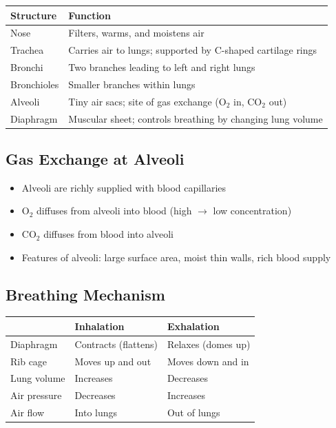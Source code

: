 \documentclass[12pt]{article}
\newcommand{\hcell}[1]{\textbf{\color{white}#1}}
\begin{document}
\begin{center}
\renewcommand{\arraystretch}{1.4}
\begin{tabular}{|C{4cm}|C{8.5cm}|}
\hline
{}\hcell{Structure} & \hcell{Function} \\
\hline
Nose & Filters, warms, and moistens air \\
 Trachea & Carries air to lungs; supported by C-shaped cartilage rings \\
Bronchi & Two branches leading to left and right lungs \\
 Bronchioles & Smaller branches within lungs \\
Alveoli & Tiny air sacs; site of gas exchange (O$_2$ in, CO$_2$ out) \\
 Diaphragm & Muscular sheet; controls breathing by changing lung volume \\
\hline
\end{tabular}
\end{center}

\subsection{Gas Exchange at Alveoli}
\begin{itemize}[leftmargin=16pt, itemsep=3pt]
  \item Alveoli are richly supplied with blood capillaries
  \item O$_2$ diffuses from alveoli into blood (high $\to$ low concentration)
  \item CO$_2$ diffuses from blood into alveoli
  \item Features of alveoli: large surface area, moist thin walls, rich blood supply
\end{itemize}

\subsection{Breathing Mechanism}
\begin{center}
\renewcommand{\arraystretch}{1.3}
\begin{tabular}{|C{3.5cm}|C{4.5cm}|C{4.5cm}|}
\hline
{}\hcell{} & \hcell{Inhalation} & \hcell{Exhalation} \\
\hline
Diaphragm & Contracts (flattens) & Relaxes (domes up) \\
 Rib cage & Moves up and out & Moves down and in \\
Lung volume & Increases & Decreases \\
 Air pressure & Decreases & Increases \\
Air flow & Into lungs & Out of lungs \\
\hline
\end{tabular}
\end{center}
\end{document}
